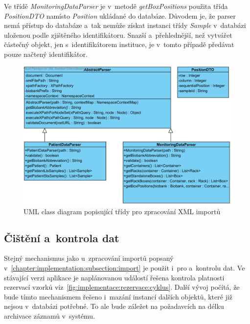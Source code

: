 \documentclass[11pt,draft,oneside]{fithesis2}
\begin{document}
Ve třídě \textit{MonitoringDataParser} je v~metodě \textit{getBoxPositions} použita třída \textit{PositionDTO} namísto \textit{Position} ukládané do databáze. Důvodem je, že parser nemá přístup do databáze a~tak nemůže získat instanci třídy \textit{Sample} v~databázi uloženou podle zjištěného identifikátoru. Snazší a~přehlednější, než vytvářet částečný objekt, jen s~identifikátorem instituce, je v~tomto případě předávat pouze načtený identifikátor. 

\begin{figure}[h!]
\begin{center}
	\includegraphics[width=\textwidth]{ParserView}
\caption{UML class diagram popisující třídy pro zpracování XML importů}
\label{fig:index:uml:class:parser}
\end{center}
\end{figure}

\subsection{Čištění a~kontrola dat}
Stejný mechanismus jako u~zpracování importů popsaný v~\ref{chapter:implementation:subsection:import} je použit i~pro  a~kontrolu dat. Ve stávající verzi aplikace je naplánovanou událostí řešena kontrola platnosti rezervací vzorků viz~\ref{fig:implementace:rezervace:cyklus}. 
Další vývoj počítá, že bude tímto mechanismem řešeno i~mazání instancí dalších objektů, které již nejsou v~databázi potřebné. To ale bude záležet na požadavcích na délku archivace záznamů v~systému.

\end{document}
